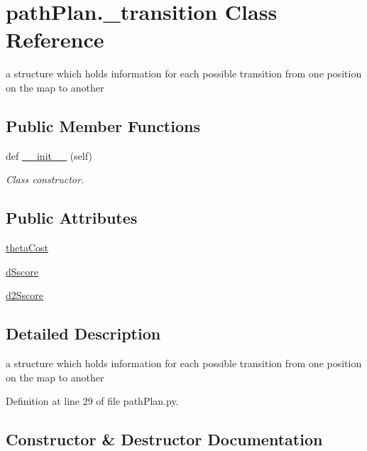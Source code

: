 \hypertarget{classpath_plan_1_1__transition}{}\section{path\+Plan.\+\_\+transition Class Reference}
\label{classpath_plan_1_1__transition}


a structure which holds information for each possible transition from one position on the map to another  


\subsection*{Public Member Functions}
\begin{DoxyCompactItemize}
\item 
def \mbox{\hyperlink{classpath_plan_1_1__transition_afec59b8f2c1a2c853caf63deac0bfac6}{\+\_\+\+\_\+init\+\_\+\+\_\+}} (self)
\begin{DoxyCompactList}\small\item\em Class constructor. \end{DoxyCompactList}\end{DoxyCompactItemize}
\subsection*{Public Attributes}
\begin{DoxyCompactItemize}
\item 
\mbox{\hyperlink{classpath_plan_1_1__transition_a8ebd19a725cfc3f89d0ab7d98dc4b097}{theta\+Cost}}
\item 
\mbox{\hyperlink{classpath_plan_1_1__transition_ab8b5b251fbf9b8ac74498e0a9a92e14d}{d\+Sscore}}
\item 
\mbox{\hyperlink{classpath_plan_1_1__transition_ae82fdb67875ff11e624058a2511ae82a}{d2\+Sscore}}
\end{DoxyCompactItemize}


\subsection{Detailed Description}
a structure which holds information for each possible transition from one position on the map to another 

Definition at line 29 of file path\+Plan.\+py.



\subsection{Constructor \& Destructor Documentation}
\mbox{\label{classpath_plan_1_1__transition_afec59b8f2c1a2c853caf63deac0bfac6}} 
